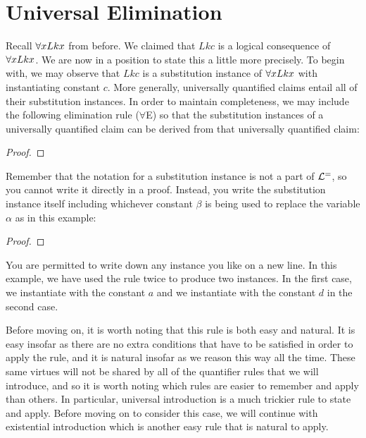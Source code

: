 \section{Universal Elimination}
  \label{sec:UniElim}

Recall $\forall x Lkx$ from before.
We claimed that $Lkc$ is a logical consequence of $\forall x Lkx$.
We are now in a position to state this a little more precisely.
To begin with, we may observe that $Lkc$ is a substitution instance of $\forall x Lkx$ with instantiating constant $c$.
More generally, universally quantified claims entail all of their substitution instances.
In order to maintain completeness, we may include the following elimination rule ($\forall$E) so that the substitution instances of a universally quantified claim can be derived from that universally quantified claim:

\begin{proof}
	  
\end{proof}

Remember that the notation for a substitution instance is not a part of $\mathcal{L}^{=}$, so you cannot write it directly in a proof.
Instead, you write the substitution instance itself including whichever constant $\beta$ is being used to replace the variable $\alpha$ as in this example:

\begin{proof}
	 \pr{}
	 
	 
\end{proof}

You are permitted to write down any instance you like on a new line. In this example, we have used the rule twice to produce two instances. In the first case, we instantiate with the constant $a$ and we instantiate with the constant $d$ in the second case. 

Before moving on, it is worth noting that this rule is both easy and natural.
It is easy insofar as there are no extra conditions that have to be satisfied in order to apply the rule, and it is natural insofar as we reason this way all the time.
These same virtues will not be shared by all of the quantifier rules that we will introduce, and so it is worth noting which rules are easier to remember and apply than others.
In particular, universal introduction is a much trickier rule to state and apply.
Before moving on to consider this case, we will continue with existential introduction which is another easy rule that is natural to apply.





